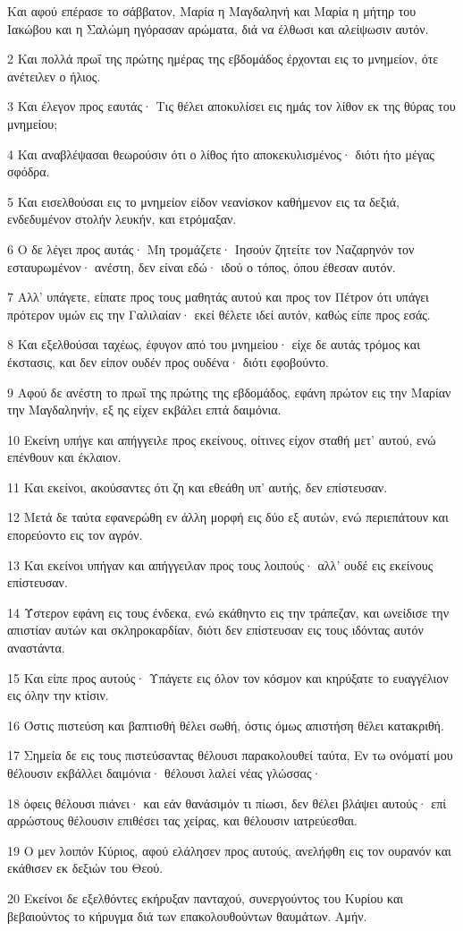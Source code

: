 \par Και αφού επέρασε το σάββατον, Μαρία η Μαγδαληνή και Μαρία η μήτηρ του Ιακώβου και η Σαλώμη ηγόρασαν αρώματα, διά να έλθωσι και αλείψωσιν αυτόν.
\par 2 Και πολλά πρωΐ της πρώτης ημέρας της εβδομάδος έρχονται εις το μνημείον, ότε ανέτειλεν ο ήλιος.
\par 3 Και έλεγον προς εαυτάς· Τις θέλει αποκυλίσει εις ημάς τον λίθον εκ της θύρας του μνημείου;
\par 4 Και αναβλέψασαι θεωρούσιν ότι ο λίθος ήτο αποκεκυλισμένος· διότι ήτο μέγας σφόδρα.
\par 5 Και εισελθούσαι εις το μνημείον είδον νεανίσκον καθήμενον εις τα δεξιά, ενδεδυμένον στολήν λευκήν, και ετρόμαξαν.
\par 6 Ο δε λέγει προς αυτάς· Μη τρομάζετε· Ιησούν ζητείτε τον Ναζαρηνόν τον εσταυρωμένον· ανέστη, δεν είναι εδώ· ιδού ο τόπος, όπου έθεσαν αυτόν.
\par 7 Αλλ' υπάγετε, είπατε προς τους μαθητάς αυτού και προς τον Πέτρον ότι υπάγει πρότερον υμών εις την Γαλιλαίαν· εκεί θέλετε ιδεί αυτόν, καθώς είπε προς εσάς.
\par 8 Και εξελθούσαι ταχέως, έφυγον από του μνημείου· είχε δε αυτάς τρόμος και έκστασις, και δεν είπον ουδέν προς ουδένα· διότι εφοβούντο.
\par 9 Αφού δε ανέστη το πρωΐ της πρώτης της εβδομάδος, εφάνη πρώτον εις την Μαρίαν την Μαγδαληνήν, εξ ης είχεν εκβάλει επτά δαιμόνια.
\par 10 Εκείνη υπήγε και απήγγειλε προς εκείνους, οίτινες είχον σταθή μετ' αυτού, ενώ επένθουν και έκλαιον.
\par 11 Και εκείνοι, ακούσαντες ότι ζη και εθεάθη υπ' αυτής, δεν επίστευσαν.
\par 12 Μετά δε ταύτα εφανερώθη εν άλλη μορφή εις δύο εξ αυτών, ενώ περιεπάτουν και επορεύοντο εις τον αγρόν.
\par 13 Και εκείνοι υπήγαν και απήγγειλαν προς τους λοιπούς· αλλ' ουδέ εις εκείνους επίστευσαν.
\par 14 Ύστερον εφάνη εις τους ένδεκα, ενώ εκάθηντο εις την τράπεζαν, και ωνείδισε την απιστίαν αυτών και σκληροκαρδίαν, διότι δεν επίστευσαν εις τους ιδόντας αυτόν αναστάντα.
\par 15 Και είπε προς αυτούς· Υπάγετε εις όλον τον κόσμον και κηρύξατε το ευαγγέλιον εις όλην την κτίσιν.
\par 16 Όστις πιστεύση και βαπτισθή θέλει σωθή, όστις όμως απιστήση θέλει κατακριθή.
\par 17 Σημεία δε εις τους πιστεύσαντας θέλουσι παρακολουθεί ταύτα, Εν τω ονόματί μου θέλουσιν εκβάλλει δαιμόνια· θέλουσι λαλεί νέας γλώσσας·
\par 18 όφεις θέλουσι πιάνει· και εάν θανάσιμόν τι πίωσι, δεν θέλει βλάψει αυτούς· επί αρρώστους θέλουσιν επιθέσει τας χείρας, και θέλουσιν ιατρεύεσθαι.
\par 19 Ο μεν λοιπόν Κύριος, αφού ελάλησεν προς αυτούς, ανελήφθη εις τον ουρανόν και εκάθισεν εκ δεξιών του Θεού.
\par 20 Εκείνοι δε εξελθόντες εκήρυξαν πανταχού, συνεργούντος του Κυρίου και βεβαιούντος το κήρυγμα διά των επακολουθούντων θαυμάτων. Αμήν.



